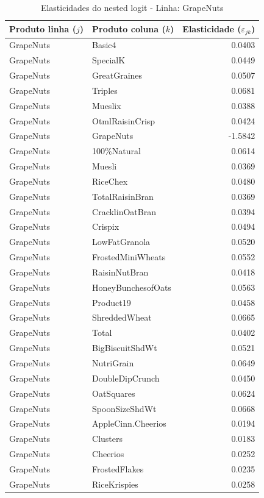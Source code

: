\begingroup
\begin{table}[H]
\centering
\caption{Elasticidades do nested logit - Linha: GrapeNuts}
\label{tab:elas-nested-grapenuts}
\small
\begin{tabular}{llr}
\toprule
Produto linha ($j$) & Produto coluna ($k$) & Elasticidade ($\varepsilon_{jk}$) \\
\midrule
GrapeNuts & Basic4 & 0.0403 \\
GrapeNuts & SpecialK & 0.0449 \\
GrapeNuts & GreatGraines & 0.0507 \\
GrapeNuts & Triples & 0.0681 \\
GrapeNuts & Mueslix & 0.0388 \\
GrapeNuts & OtmlRaisinCrisp & 0.0424 \\
GrapeNuts & GrapeNuts & -1.5842 \\
GrapeNuts & 100\%Natural & 0.0614 \\
GrapeNuts & Muesli & 0.0369 \\
GrapeNuts & RiceChex & 0.0480 \\
GrapeNuts & TotalRaisinBran & 0.0369 \\
GrapeNuts & CracklinOatBran & 0.0394 \\
GrapeNuts & Crispix & 0.0494 \\
GrapeNuts & LowFatGranola & 0.0520 \\
GrapeNuts & FrostedMiniWheats & 0.0552 \\
GrapeNuts & RaisinNutBran & 0.0418 \\
GrapeNuts & HoneyBunchesofOats & 0.0563 \\
GrapeNuts & Product19 & 0.0458 \\
GrapeNuts & ShreddedWheat & 0.0665 \\
GrapeNuts & Total & 0.0402 \\
GrapeNuts & BigBiscuitShdWt & 0.0521 \\
GrapeNuts & NutriGrain & 0.0649 \\
GrapeNuts & DoubleDipCrunch & 0.0450 \\
GrapeNuts & OatSquares & 0.0624 \\
GrapeNuts & SpoonSizeShdWt & 0.0668 \\
GrapeNuts & AppleCinn.Cheerios & 0.0194 \\
GrapeNuts & Clusters & 0.0183 \\
GrapeNuts & Cheerios & 0.0252 \\
GrapeNuts & FrostedFlakes & 0.0235 \\
GrapeNuts & RiceKrispies & 0.0258 \\

\end{tabular}
\end{table}
